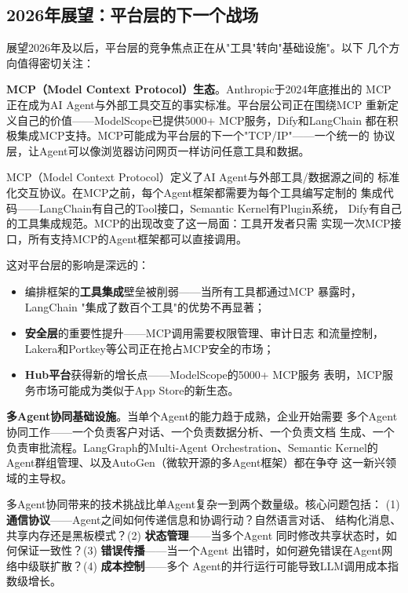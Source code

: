 \subsection{2026年展望：平台层的下一个战场}

展望2026年及以后，平台层的竞争焦点正在从"工具"转向"基础设施"。以下
几个方向值得密切关注：

\textbf{MCP（Model Context Protocol）生态}。Anthropic于2024年底推出的
MCP正在成为AI Agent与外部工具交互的事实标准。平台层公司正在围绕MCP
重新定义自己的价值——ModelScope已提供5000+ MCP服务，Dify和LangChain
都在积极集成MCP支持。MCP可能成为平台层的下一个"TCP/IP"——一个统一的
协议层，让Agent可以像浏览器访问网页一样访问任意工具和数据。

\begin{whybox}[MCP为什么可能重塑平台层格局？]
MCP（Model Context Protocol）定义了AI Agent与外部工具/数据源之间的
标准化交互协议。在MCP之前，每个Agent框架都需要为每个工具编写定制的
集成代码——LangChain有自己的Tool接口，Semantic Kernel有Plugin系统，
Dify有自己的工具集成规范。MCP的出现改变了这一局面：工具开发者只需
实现一次MCP接口，所有支持MCP的Agent框架都可以直接调用。

这对平台层的影响是深远的：
\begin{itemize}
  \item 编排框架的\textbf{工具集成}壁垒被削弱——当所有工具都通过MCP
    暴露时，LangChain "集成了数百个工具"的优势不再显著；
  \item \textbf{安全层}的重要性提升——MCP调用需要权限管理、审计日志
    和流量控制，Lakera和Portkey等公司正在抢占MCP安全的市场；
  \item \textbf{Hub平台}获得新的增长点——ModelScope的5000+ MCP服务
    表明，MCP服务市场可能成为类似于App Store的新生态。
\end{itemize}
\end{whybox}

\textbf{多Agent协同基础设施}。当单个Agent的能力趋于成熟，企业开始需要
多个Agent协同工作——一个负责客户对话、一个负责数据分析、一个负责文档
生成、一个负责审批流程。LangGraph的Multi-Agent Orchestration、Semantic
Kernel的Agent群组管理、以及AutoGen（微软开源的多Agent框架）都在争夺
这一新兴领域的主导权。

多Agent协同带来的技术挑战比单Agent复杂一到两个数量级。核心问题包括：
(1) \textbf{通信协议}——Agent之间如何传递信息和协调行动？自然语言对话、
结构化消息、共享内存还是黑板模式？(2) \textbf{状态管理}——当多个Agent
同时修改共享状态时，如何保证一致性？(3) \textbf{错误传播}——当一个Agent
出错时，如何避免错误在Agent网络中级联扩散？(4) \textbf{成本控制}——多个
Agent的并行运行可能导致LLM调用成本指数级增长。

